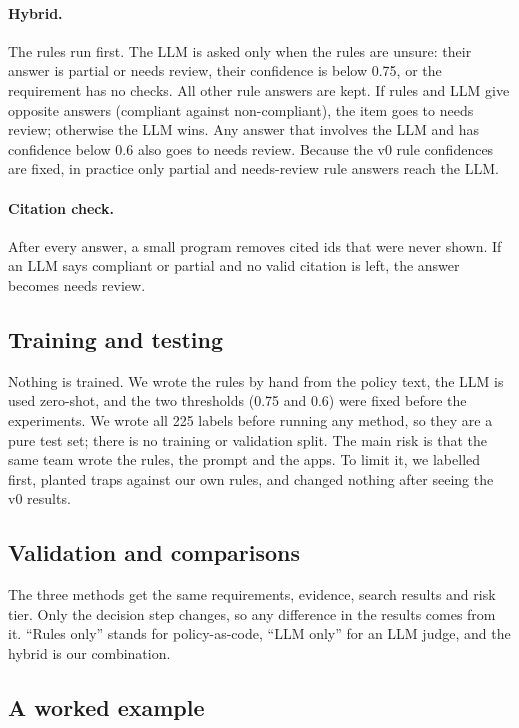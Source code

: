 \paragraph{Hybrid.} The rules run first. The LLM is asked only when the rules are unsure: their answer is partial or
needs review, their confidence is below 0.75, or the requirement has no checks. All other rule answers are kept. If
rules and LLM give opposite answers (compliant against non-compliant), the item goes to needs review; otherwise the LLM
wins. Any answer that involves the LLM and has confidence below 0.6 also goes to needs review. Because the v0 rule
confidences are fixed, in practice only partial and needs-review rule answers reach the LLM.

\paragraph{Citation check.} After every answer, a small program removes cited ids that were never shown. If an LLM says
compliant or partial and no valid citation is left, the answer becomes needs review.

\subsection{Training and testing}
\label{section:training}

Nothing is trained. We wrote the rules by hand from the policy text, the LLM is used zero-shot, and the two thresholds
(0.75 and 0.6) were fixed before the experiments. We wrote all 225 labels before running any method, so they are a pure
test set; there is no training or validation split. The main risk is that the same team wrote the rules, the prompt and
the apps. To limit it, we labelled first, planted traps against our own rules, and changed nothing after seeing the v0
results.

\subsection{Validation and comparisons}
\label{section:validation}

The three methods get the same requirements, evidence, search results and risk tier. Only the decision step changes,
so any difference in the results comes from it. ``Rules only'' stands for policy-as-code, ``LLM only'' for an LLM
judge, and the hybrid is our combination.

\subsection{A worked example}
\label{section:example}

